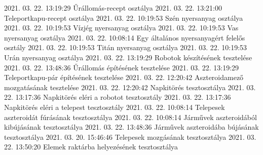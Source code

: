  {2021. 03. 22. 13:19:29} {Űrállomás-recept osztálya}
 {2021. 03. 22. 13:21:00} {Teleportkapu-recept osztálya}
 {2021. 03. 22. 10:19:53} {Szén nyersanyag osztálya}
 {2021. 03. 22. 10:19:53} {Vízjég nyersanyag osztálya}
 {2021. 03. 22. 10:19:53} {Vas nyersanyag osztálya}
 {2021. 03. 22. 10:08:14} {Egy általános nyersanyagért felelős osztály}
 {2021. 03. 22. 10:19:53} {Titán nyersanyag osztálya}
 {2021. 03. 22. 10:19:53} {Urán nyersanyag osztálya}
 {2021. 03. 22. 13:19:29} {Robotok készítésének tesztelése}
 {2021. 03. 22. 13:48:36} {Űrállomás építésének tesztelése}
 {2021. 03. 22. 13:19:29} {Teleportkapu-pár építésének tesztelése}
 {2021. 03. 22. 12:20:42} {Aszteroidamező mozgatásának tesztelése}
 {2021. 03. 22. 12:20:42} {Napkitörés tesztosztálya}
 {2021. 03. 22. 13:17:36} {Napkitörés eléri a robotot tesztosztály}
 {2021. 03. 22. 13:17:36} {Napkitörés eléri a telepest tesztosztály}
 {2021. 03. 22. 10:08:14} {Telepesek aszteroidát fúrásának tesztosztálya}
 {2021. 03. 22. 10:08:14} {Járművek aszteroidából kibújásának tesztosztálya}
 {2021. 03. 22. 13:48:36} {Járművek aszteroidába bújásának tesztosztálya}
 {2021. 03. 20. 15:46:46} {Telepesek mozgásának tesztosztálya}
 {2021. 03. 22. 13:50:20} {Elemek raktárba helyezésének tesztosztálya}
